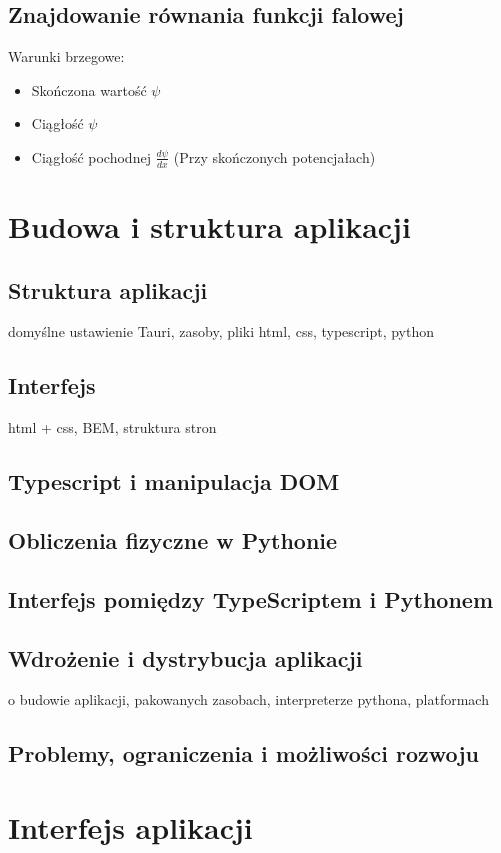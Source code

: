 \documentclass{SGGW-thesis}
\begin{document}
	\section{Znajdowanie równania funkcji falowej}
	Warunki brzegowe:
	\begin{itemize}
	\item Skończona wartość $\psi$
	\item Ciągłość $\psi$
	\item Ciągłość pochodnej $\frac{d\psi}{dx}$ (Przy skończonych potencjałach)
	\end{itemize}
	
	
\chapter{Budowa i struktura aplikacji}
	\section{Struktura aplikacji}
	domyślne ustawienie Tauri, zasoby, pliki html, css, typescript, python
	\section{Interfejs}
	html + css, BEM, struktura stron
	\section{Typescript i manipulacja DOM}
	\section{Obliczenia fizyczne w Pythonie}
	\section{Interfejs pomiędzy TypeScriptem i Pythonem}
	\section{Wdrożenie i dystrybucja aplikacji}
	o budowie aplikacji, pakowanych zasobach, interpreterze pythona, platformach
	\section{Problemy, ograniczenia i możliwości rozwoju}

\chapter{Interfejs aplikacji}
\end{document}
